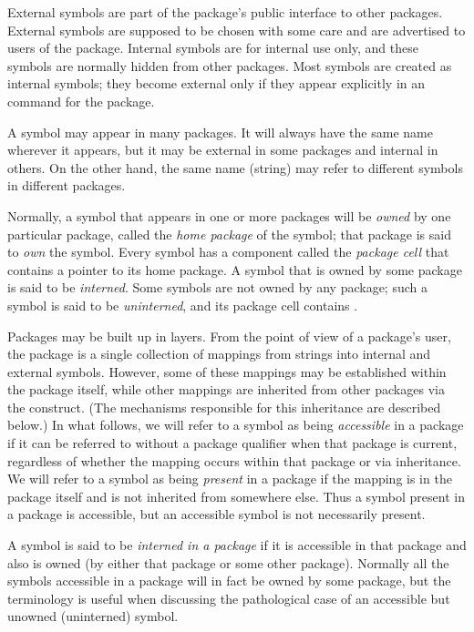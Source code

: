 External symbols are part of the package's public interface to other
packages.  External symbols are supposed to be chosen with some care and are
advertised to users of the package.  Internal symbols are for internal
use only, and these symbols are normally hidden from other packages.
Most symbols are created as internal symbols; they become external only
if they appear explicitly in an  command for the package.

A symbol may appear in many packages.  It will always have the same
name wherever it appears, but it may be external in some packages
and internal in others.  On the other hand,
the same name (string) may refer to different symbols in
different packages.

Normally, a symbol that appears in one or more packages
will be \emph{owned} by one particular package, called the \emph{home package}
of the symbol; that package is said to \emph{own} the symbol.
Every symbol has a component called the \emph{package cell}
that contains a pointer to its home package.
A symbol that is owned by some package is said to be \emph{interned}.
Some symbols are not owned by any package; such a symbol
is said to be \emph{uninterned}, and its package cell contains {\false}.

Packages may be built up in layers.  From the point of view of a
package's user, the package is a single collection of mappings from
strings into internal and external symbols.  However, some of these
mappings may be established within the package itself, while other
mappings are inherited from other packages via the 
construct.  (The mechanisms responsible for this inheritance are
described below.)  In what follows, we will refer to a symbol as being
\emph{accessible} in a package if it can be referred to
without a package qualifier when that package is current,
regardless of whether the mapping occurs within
that package or via inheritance.   We will refer to a symbol as being
\emph{present} in a package if the mapping is in the package itself and is
not inherited from somewhere else.  Thus a symbol present in a package is accessible,
but an accessible symbol is not necessarily present.

A symbol is said to be \emph{interned in a package} if it is
accessible in that package and also is owned (by either that package
or some other package).  Normally all the symbols accessible in
a package will in fact be owned by some package,
but the terminology is useful when
discussing the pathological case of an accessible but unowned (uninterned)
symbol.


